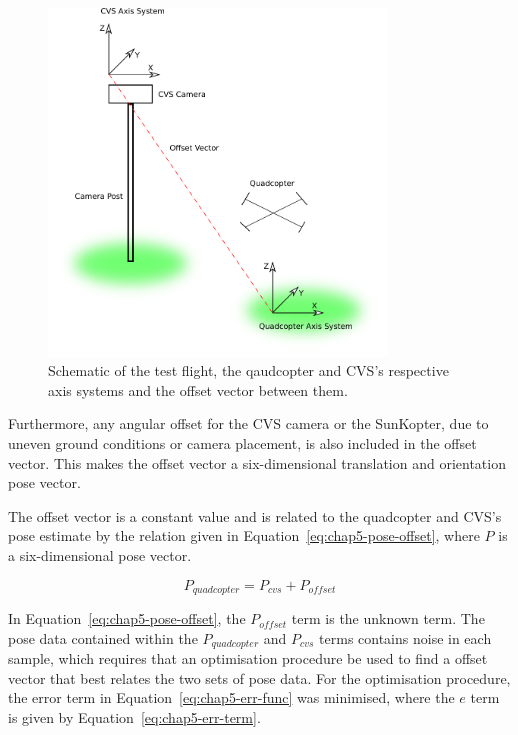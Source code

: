\begin{figure}
  \centering
  \includegraphics[width=0.8\textwidth]{figures/chapter5/test_flight_schem}
  \caption[Shematic of the test flight layout.]{Schematic of the test flight, the qaudcopter and CVS's respective axis systems and the offset vector between them.}
\label{fig:chap5-flight-test-schem}
\end{figure}

Furthermore, any angular offset for the CVS camera or the SunKopter, due to uneven ground conditions or camera placement, is also included in the offset vector. This makes the offset vector a six-dimensional translation and orientation pose vector. 

The offset vector is a constant value and is related to the quadcopter and CVS's pose estimate by the relation given in Equation~\ref{eq:chap5-pose-offset}, where $P$ is a six-dimensional pose vector. 

\begin{equation}
  \label{eq:chap5-pose-offset}
  P_{quadcopter} = P_{cvs} + P_{offset}
\end{equation}

In Equation~\ref{eq:chap5-pose-offset}, the $P_{offset}$ term is the unknown term. The pose data contained within the $P_{quadcopter}$ and $P_{cvs}$ terms contains noise in each sample, which requires that an optimisation procedure be used to find a offset vector that best relates the two sets of pose data. For the optimisation procedure, the error term in Equation~\ref{eq:chap5-err-func} was minimised, where the $e$ term is given by Equation~\ref{eq:chap5-err-term}. 

